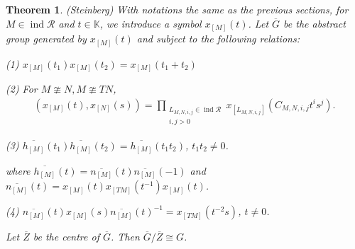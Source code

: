 \documentclass[12pt]{amsart}
\newtheorem{theorem}{Theorem}[section]
\begin{document}
\begin{theorem}\label{steinberg}
    (Steinberg) With notations the same as the previous sections, 
    for $ M\in \operatorname{ind}\mathcal{R}$ and $ t\in \mathbb{K}$, we introduce a symbol $x_{[M]}(t)$.
    Let $\overline{G}$ be the abstract group generated by $x_{[M]}(t)$ and subject to the following relations:

    (1) $x_{[M]}(t_1) x_{[M]}(t_2) = x_{[M]}(t_1+t_2)$

    (2) For $M\ncong N,M\ncong TN$, 
    \begin{align*}
        (x_{[M]}(t),x_{[N]}(s)) = \prod_{\substack{L_{M,N,i,j}\in \operatorname{ind}\mathcal{R} \\ i,j>0}} x_{[L_{M,N,i,j}]}(C_{M,N,i,j}t^is^j).
    \end{align*}

    (3) $\overline{h_{[M]}}(t_1)\overline{h_{[M]}}(t_2) = \overline{h_{[M]}}(t_1t_2)$, $t_1t_2\neq 0$.

    where $\overline{h_{[M]}}(t) = \overline{n_{[M]}}(t) \overline{n_{[M]}}(-1)$ and $\overline{n_{[M]}}(t) = x_{[M]}(t)x_{[TM]}(t^{-1}) x_{[M]}(t)$.

    (4) $\overline{n_{[M]}}(t) x_{[M]}(s) \overline{n_{[M]}}(t)^{-1} = x_{[TM]}(t^{-2}s)$, $t\neq 0$.

    Let $\overline{Z} $ be the centre of $\overline{G}$. Then $\overline{G}/\overline{Z}\cong G$.
\end{theorem}
\end{document}
